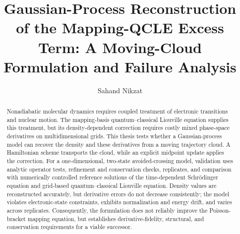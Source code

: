 \documentclass[
  11pt,
  letterpaper,
  onehalfspacing,
  normalmargins,
  equalmargins,
  oneside
]{ut-thesis}
\title{Gaussian-Process Reconstruction of the Mapping-QCLE Excess Term: A Moving-Cloud Formulation and Failure Analysis}
\author{Sahand Nikzat}
\begin{document}
\frontmatter
\maketitle

\begin{abstract}
\label{sec:abstract}
\begin{onehalfspace}
Nonadiabatic molecular dynamics requires coupled treatment of electronic transitions and nuclear motion. The mapping-basis quantum--classical Liouville equation supplies this treatment, but its density-dependent correction requires costly mixed phase-space derivatives on multidimensional grids. This thesis tests whether a Gaussian-process model can recover the density and these derivatives from a moving trajectory cloud. A Hamiltonian scheme transports the cloud, while an explicit midpoint update applies the correction. For a one-dimensional, two-state avoided-crossing model, validation uses analytic operator tests, refinement and conservation checks, replicates, and comparison with numerically controlled reference solutions of the time-dependent Schrödinger equation and grid-based quantum--classical Liouville equation. Density values are reconstructed accurately, but derivative errors do not decrease consistently; the model violates electronic-state constraints, exhibits normalization and energy drift, and varies across replicates. Consequently, the formulation does not reliably improve the Poisson-bracket mapping equation, but establishes derivative-fidelity, structural, and conservation requirements for a viable successor.

\end{onehalfspace}
\end{abstract}
\end{document}
